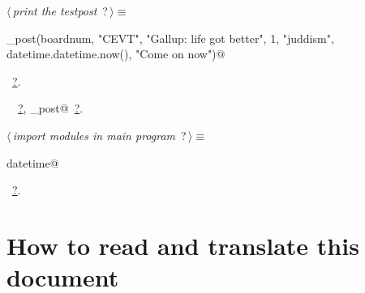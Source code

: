 \documentclass[twoside]{artikel3}
\renewcommand{\NWlink}[2]{\hyperlink{#1}{#2}}
\renewcommand{\NWtarget}[2]{\hypertarget{#1}{#2}}
\renewcommand{\NWsep}{$\diamond$\rule[-1\baselineskip]{0pt}{1\baselineskip}}
\renewcommand{\NWlink}[2]{\hyperlink{#1}{#2}}
\renewcommand{\NWtarget}[2]{\hypertarget{#1}{#2}}
\begin{document}
\begin{flushleft} \small
\begin{minipage}{\linewidth}\label{scrap4}\raggedright\small
\NWtarget{nuweb?}{} $\langle\,${\itshape print the testpost}\nobreak\ {\footnotesize {?}}$\,\rangle\equiv$
\vspace{-1ex}
\begin{list}{}{} \item
\mbox{}\verb@print_post(boardnum, "CEVT", "Gallup: life got better", 1, "juddism", datetime.datetime.now(), "Come on now")@\\
\mbox{}\verb@@{\NWsep}
\end{list}
\vspace{-1.5ex}
\footnotesize
\begin{list}{}{\setlength{\itemsep}{-\parsep}\setlength{\itemindent}{-\leftmargin}}
\item \NWtxtMacroRefIn\ \NWlink{nuweb?}{?}.
\item \NWtxtIdentsUsed\nobreak\  \verb@boardnum@\nobreak\ \NWlink{nuweb?}{?}, \verb@print_post@\nobreak\ \NWlink{nuweb?}{?}.
\item{}
\end{list}
\end{minipage}\vspace{4ex}
\end{flushleft}
\begin{flushleft} \small
\begin{minipage}{\linewidth}\label{scrap5}\raggedright\small
\NWtarget{nuweb?}{} $\langle\,${\itshape import modules in main program}\nobreak\ {\footnotesize {?}}$\,\rangle\equiv$
\vspace{-1ex}
\begin{list}{}{} \item
\mbox{}\verb@import datetime@\\
\mbox{}\verb@@{\NWsep}
\end{list}
\vspace{-1.5ex}
\footnotesize
\begin{list}{}{\setlength{\itemsep}{-\parsep}\setlength{\itemindent}{-\leftmargin}}
\item \NWtxtMacroRefIn\ \NWlink{nuweb?}{?}.

\item{}
\end{list}
\end{minipage}\vspace{4ex}
\end{flushleft}
\appendix

\section{How to read and translate this document}
\label{sec:translatedoc}
\end{document}
